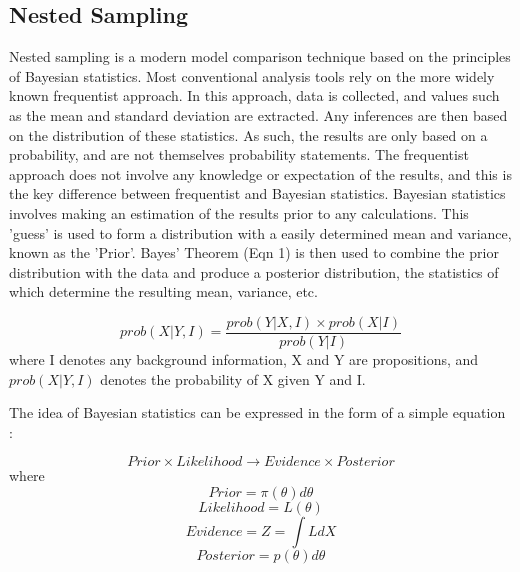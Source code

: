 \documentclass[a4paper,12pt]{article}
\begin{document}
\subsection{Nested Sampling}
Nested sampling is a modern model comparison technique based on the principles of Bayesian statistics.  Most conventional analysis tools rely on the more widely known frequentist approach. In this approach, data is collected, and values such as the mean and standard deviation are extracted.  Any inferences are then based on the distribution of these statistics.  As such, the results are only based on a probability, and are not themselves probability statements.  The frequentist approach does not involve any knowledge or expectation of the results, and this is the key difference between frequentist and Bayesian statistics. \cite{bayes}
\newline
Bayesian statistics involves making an estimation of the results prior to any calculations.  This 'guess' is used to form a distribution with a easily determined mean and variance, known as the 'Prior'.  Bayes' Theorem (Eqn 1) is then used to combine the prior distribution with the data and produce a posterior distribution, the statistics of which determine the resulting mean, variance, etc. \cite{sivia} 
\newline

\begin{equation}
 prob(X|Y,I) = \frac{prob(Y|X,I) \times prob(X|I)}{prob(Y|I)}
\end{equation}
where I denotes any background information, X and Y are propositions, and $prob(X|Y,I)$ denotes the probability of X given Y and I.

The idea of Bayesian statistics can be expressed in the form of a simple equation \cite{skilling}:

\begin{equation}
 Prior \times Likelihood \longrightarrow Evidence \times Posterior
\end{equation}
where
\begin{equation}
 Prior = \pi(\theta)d\theta 
\end{equation}
\begin{equation}
 Likelihood = L(\theta)
\end{equation}
\begin{equation}
 Evidence = Z = \int LdX
\end{equation}
\begin{equation}
 Posterior = p(\theta)d\theta
\end{equation}
\end{document}
